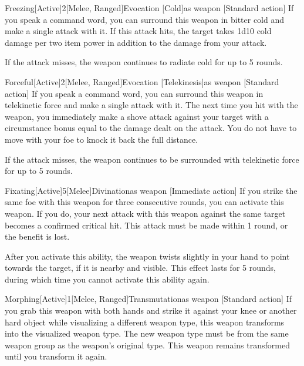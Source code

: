         \begin{magicitemdef}{Freezing}[Active]{2}[Melee, Ranged]{Evocation [Cold]}{as weapon}
            [Standard action] If you speak a command word, you can surround this weapon in bitter cold and make a single attack with it. If this attack hits, the target takes 1d10 cold damage per two item power in addition to the damage from your attack.

            If the attack misses, the weapon continues to radiate cold for up to 5 rounds.
        \end{magicitemdef}

        \begin{magicitemdef}{Forceful}[Active]{2}[Melee, Ranged]{Evocation [Telekinesis]}{as weapon}
            [Standard action] If you speak a command word, you can surround this weapon in telekinetic force and make a single attack with it. The next time you hit with the weapon, you immediately make a shove attack against your target with a circumstance bonus equal to the damage dealt on the attack. You do not have to move with your foe to knock it back the full distance.

            If the attack misses, the weapon continues to be surrounded with telekinetic force for up to 5 rounds.
        \end{magicitemdef}

        \begin{magicitemdef}{Fixating}[Active]{5}[Melee]{Divination}{as weapon}
            [Immediate action] If you strike the same foe with this weapon for three consecutive rounds, you can activate this weapon.
            If you do, your next attack with this weapon against the same target becomes a confirmed critical hit.
            This attack must be made within 1 round, or the benefit is lost.

            After you activate this ability, the weapon twists slightly in your hand to point towards the target, if it is nearby and visible.
            This effect lasts for 5 rounds, during which time you cannot activate this ability again.
        \end{magicitemdef}

        \begin{magicitemdef}{Morphing}[Active]{1}[Melee, Ranged]{Transmutation}{as weapon}
            [Standard action] If you grab this weapon with both hands and strike it against your knee or another hard object while visualizing a different weapon type, this weapon transforms into the visualized weapon type.
            The new weapon type must be from the same weapon group as the weapon's original type.
            This weapon remains transformed until you transform it again.
        \end{magicitemdef}

